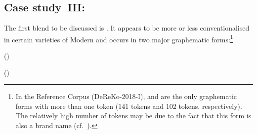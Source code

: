 \documentclass[output=paper
  ,nobabel
  ,draftmode
  ,colorlinks, citecolor=brown
]{langscibook}
\begin{document}
\subsection{Case study III: \emph{}}
\label{section.subord-blend}
The first blend to be discussed is \emph{}. It appears to be more or less
conventionalised in certain varieties of Modern  and occurs in two major
graphematic forms:\footnote{In the  Reference Corpus (DeReKo-2018-I),
\emph{} and \emph{} are the only graphematic forms
with more than one token (141 tokens and 102 tokens, respectively). The
relatively high number of \emph{} tokens may be due to the fact that this form
is also a brand name (cf.\ \citealt[413]{friedrich:2008:kontamination:form}).} \begin{exe}
\ex \raggedright \begin{taggedline}[0.99]{()}
\begin{pairingline}
\end{pairingline}
\end{taggedline}
\end{exe}
\begin{exe}
\ex \raggedright \begin{taggedline}[0.99]{()}
\begin{pairingline}
\end{pairingline}
\end{taggedline}
\end{exe}
\end{document}
